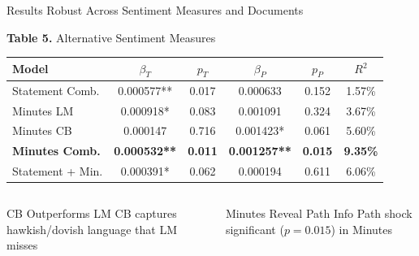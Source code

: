\documentclass[aspectratio=169, 11pt]{beamer}
\begin{document}
\begin{frame}{Results Robust Across Sentiment Measures and Documents}
\begin{center}
{\small \textbf{Table 5.} Alternative Sentiment Measures}
\end{center}
\vspace{0.1em}
\begin{center}
{\footnotesize
\begin{tabular}{lccccc}
\toprule
Model & $\beta_T$ & $p_T$ & $\beta_P$ & $p_P$ & $R^2$ \\
\midrule
Statement Comb. & 0.000577** & 0.017 & 0.000633 & 0.152 & 1.57\% \\
Minutes LM & 0.000918* & 0.083 & 0.001091 & 0.324 & 3.67\% \\
Minutes CB & 0.000147 & 0.716 & 0.001423* & 0.061 & 5.60\% \\
\textbf{Minutes Comb.} & \textbf{0.000532**} & \textbf{0.011} & \textbf{0.001257**} & \textbf{0.015} & \textbf{9.35\%} \\
Statement + Min. & 0.000391* & 0.062 & 0.000194 & 0.611 & 6.06\% \\
\bottomrule
\end{tabular}
}
\end{center}

\vspace{0.2em}
\begin{columns}[T]
\begin{aexampleblock}{CB Outperforms LM}
CB captures hawkish/dovish language that LM misses
\end{aexampleblock}

\begin{ablock}{Minutes Reveal Path Info}
Path shock significant ($p = 0.015$) in Minutes
\end{ablock}
\end{columns}
\end{frame}
\end{document}
